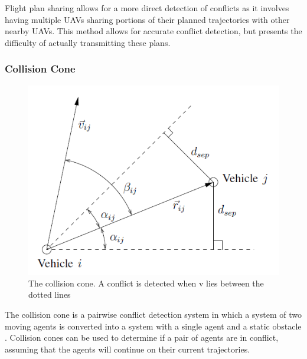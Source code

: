 \documentclass[conference]{IEEEtran}
\begin{document}
Flight plan sharing allows for a more direct detection of conflicts as it involves having multiple UAVs sharing portions of their planned trajectories with other nearby UAVs.  This method allows for accurate conflict detection, but presents the difficulty of actually transmitting these plans.  

\subsubsection{Collision Cone}

\begin{figure}[h]
	\includegraphics [width=1\columnwidth] {2008Kristi}
	\caption{The collision cone. A conflict is detected when v lies between the dotted lines \cite{lalish2008decentralized}}
	\label{fig:cone}
\end{figure}

The collision cone is a pairwise conflict detection system in which a system of two moving agents is converted into a system with a single agent and a static obstacle \cite{danielscollision}.  Collision cones can be used to determine if a pair of agents are in conflict, assuming that the agents will continue on their current trajectories.
\end{document}
